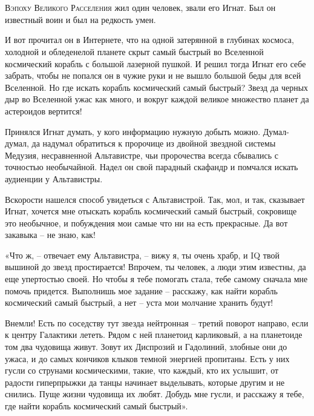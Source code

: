 \documentclass[ebook,oneside,final,openright]{memoir}
\begin{document}
\chapter{}
 \lettrine{В}{эпоху Великого Расселения} жил один человек, звали его Игнат. Был он известный воин и был на редкость умен.\par
\par
И вот прочитал он в Интернете, что на одной затерянной в глубинах космоса, холодной и обледенелой планете скрыт самый быстрый во Вселенной космический корабль с большой лазерной пушкой. И решил тогда Игнат его себе забрать, чтобы не попался он в чужие руки и не вышло большой беды для всей Вселенной. Но где искать корабль космический самый быстрый? Звезд да черных дыр во Вселенной ужас как много, и вокруг каждой великое множество планет да астероидов вертится!\par
\par
Принялся Игнат думать, у кого информацию нужную добыть можно. Думал-думал, да надумал обратиться к пророчице из двойной звездной системы Медузия, несравненной Альтавистре, чьи пророчества всегда сбывались с точностью необычайной. Надел он свой парадный скафандр и помчался искать аудиенции у Альтавистры.\par
\par
Вскорости нашелся способ увидеться с Альтавистрой. Так, мол, и так, сказывает Игнат, хочется мне отыскать корабль космический самый быстрый, сокровище это необычное, и побуждения мои самые что ни на есть прекрасные. Да вот закавыка – не знаю, как!\par
\par
«Что ж, – отвечает ему Альтавистра, – вижу я, ты очень храбр, и IQ твой вышиной до звезд простирается! Впрочем, ты человек, а люди этим известны, да еще упертостью своей. Но чтобы я тебе помогать стала, тебе самому сначала мне помочь придется. Выполнишь мое задание – расскажу, как найти корабль космический самый быстрый, а нет – уста мои молчание хранить будут!\par
\par
Внемли! Есть по соседству тут звезда нейтронная – третий поворот направо, если к центру Галактики лететь. Рядом с ней планетоид карликовый, а на планетоиде том два чудовища живут. Зовут их Диспрозий и Гадолиний, злобные они до ужаса, и до самых кончиков клыков темной энергией пропитаны. Есть у них гусли со струнами космическими, такие, что каждый, кто их услышит, от радости гиперпрыжки да танцы начинает выделывать, которые другим и не снились. Пуще жизни чудовища их любят. Добудь мне гусли, и расскажу я тебе, где найти корабль космический самый быстрый».\par
\end{document}
